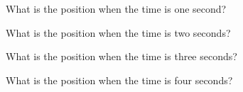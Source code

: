 \begin{problem}
\begin{subproblem}
    \scalebox{0.8}{}

    \item What is the position when the time is one second?
      \vspace{3em}

    \item What is the position when the time is two seconds?
      \vspace{3em}

    \item What is the position when the time is three seconds?
      \vspace{3em}

    \item What is the position when the time is four seconds?
      \vspace{3em}

  \end{subproblem}



\end{problem}



